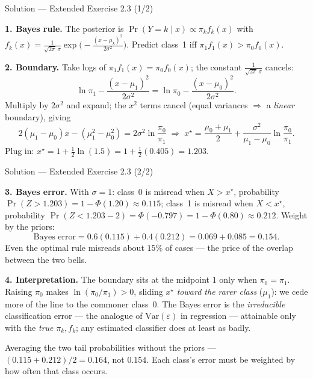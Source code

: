 \documentclass[aspectratio=169,11pt]{beamer}
\begin{document}
\begin{frame}{Solution --- Extended Exercise 2.3 (1/2)}
\begin{solutionbox}
\textbf{1. Bayes rule.} The posterior is $\Pr(Y{=}k\mid x)\propto\pi_k f_k(x)$ with $f_k(x)=\frac{1}{\sqrt{2\pi}\,\sigma}\exp\!\big(-\frac{(x-\mu_k)^2}{2\sigma^2}\big)$. Predict class~1 iff $\pi_1 f_1(x)>\pi_0 f_0(x)$.

\textbf{2. Boundary.} Take logs of $\pi_1 f_1(x)=\pi_0 f_0(x)$; the constant $\frac{1}{\sqrt{2\pi}\,\sigma}$ cancels:
\[
\ln\pi_1-\frac{(x-\mu_1)^2}{2\sigma^2}=\ln\pi_0-\frac{(x-\mu_0)^2}{2\sigma^2}.
\]
Multiply by $2\sigma^2$ and expand; the $x^2$ terms cancel (equal variances $\Rightarrow$ a \emph{linear} boundary), giving
\[
2(\mu_1-\mu_0)x-(\mu_1^2-\mu_0^2)=2\sigma^2\ln\frac{\pi_0}{\pi_1}
\;\Rightarrow\;
x^\star=\frac{\mu_0+\mu_1}{2}+\frac{\sigma^2}{\mu_1-\mu_0}\ln\frac{\pi_0}{\pi_1}.
\]
Plug in: $x^\star=1+\tfrac12\ln(1.5)=1+\tfrac12(0.405)=\mathbf{1.203}$.
\end{solutionbox}
\end{frame}

\begin{frame}{Solution --- Extended Exercise 2.3 (2/2)}
\begin{solutionbox}
\textbf{3. Bayes error.} With $\sigma=1$: class~0 is misread when $X>x^\star$, probability $\Pr(Z>1.203)=1-\Phi(1.20)\approx0.115$; class~1 is misread when $X<x^\star$, probability $\Pr(Z<1.203-2)=\Phi(-0.797)=1-\Phi(0.80)\approx0.212$. Weight by the priors:
\[
\text{Bayes error}=0.6(0.115)+0.4(0.212)=0.069+0.085=\mathbf{0.154}.
\]
Even the optimal rule misreads about $15\%$ of cases --- the price of the overlap between the two bells.

\textbf{4. Interpretation.} The boundary sits at the midpoint $1$ only when $\pi_0=\pi_1$. Raising $\pi_0$ makes $\ln(\pi_0/\pi_1)>0$, sliding $x^\star$ \emph{toward the rarer class} ($\mu_1$): we cede more of the line to the commoner class~0. The Bayes error is the \emph{irreducible} classification error --- the analogue of $\mathrm{Var}(\varepsilon)$ in regression --- attainable only with the \emph{true} $\pi_k,f_k$; any estimated classifier does at least as badly.
\end{solutionbox}
\begin{mistake}
Averaging the two tail probabilities without the priors --- $(0.115+0.212)/2 = 0.164$, not $0.154$. Each class's error must be weighted by how often that class occurs.
\end{mistake}
\end{frame}
\end{document}
